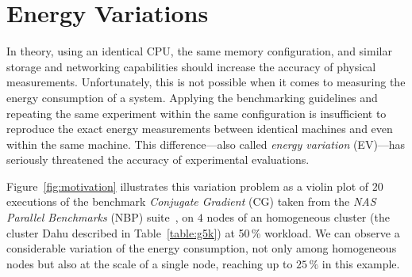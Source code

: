 








\section{Energy Variations}\label{sec:energy_variation}
In theory, using an identical CPU, the same memory configuration, and similar storage and networking capabilities should increase the accuracy of physical measurements.
Unfortunately, this is not possible when it comes to measuring the energy consumption of a system.
Applying the benchmarking guidelines and repeating the same experiment within the same configuration is insufficient to reproduce the exact energy measurements between identical machines and even within the same machine.
This difference---also called \emph{energy variation} (EV)---has seriously threatened the accuracy of experimental evaluations.

Figure~\ref{fig:motivation} illustrates this variation problem as a violin plot of $20$ executions of the benchmark \emph{Conjugate Gradient} (\textsf{CG}) taken from the \emph{NAS Parallel Benchmarks} (NBP) suite~\cite{Bailey:1991:NPB:125826.125925}, on $4$ nodes of an homogeneous cluster (the cluster \textsf{Dahu} described in Table~\ref{table:g5k}) at 50\,\% workload.
We can observe a considerable variation of the energy consumption, not only among homogeneous nodes but also at the scale of a single node, reaching up to $25\,\%$ in this example.


